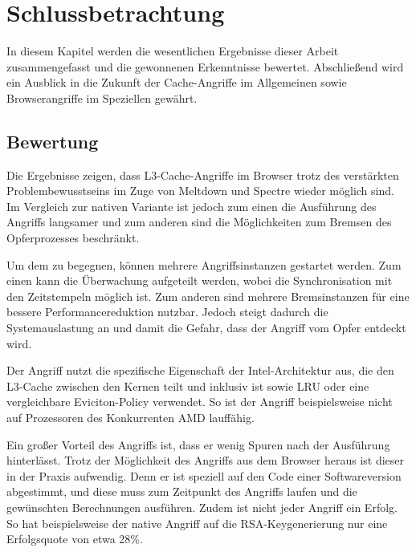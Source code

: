 \chapter{Schlussbetrachtung}
\label{chapter:conclusions}

In diesem Kapitel werden die wesentlichen Ergebnisse dieser Arbeit zusammengefasst und die gewonnenen Erkenntnisse bewertet.
Abschließend wird ein Ausblick in die Zukunft der Cache-Angriffe im Allgemeinen sowie Browserangriffe im Speziellen gewährt.

\section{Bewertung}

Die Ergebnisse zeigen, dass L3-Cache-Angriffe im Browser trotz des verstärkten Problembewusstseins im Zuge von Meltdown und Spectre wieder möglich sind.
Im Vergleich zur nativen Variante ist jedoch zum einen die Ausführung des Angriffs langsamer und zum anderen sind die Möglichkeiten zum Bremsen des Opferprozesses beschränkt.

Um dem zu begegnen, können mehrere Angriffsinstanzen gestartet werden.
Zum einen kann die Überwachung aufgeteilt werden, wobei die Synchronisation mit den Zeitstempeln möglich ist.
Zum anderen sind mehrere Bremsinstanzen für eine bessere Performancereduktion nutzbar.
Jedoch steigt dadurch die Systemauslastung an und damit die Gefahr, dass der Angriff vom Opfer entdeckt wird. 


Der Angriff nutzt die spezifische Eigenschaft der Intel-Architektur aus, die den L3-Cache zwischen den Kernen teilt und inklusiv ist sowie LRU oder eine vergleichbare Eviciton-Policy verwendet. 
So ist der Angriff beispielsweise nicht auf Prozessoren des Konkurrenten AMD lauffähig.

Ein großer Vorteil des Angriffs ist, dass er wenig Spuren nach der Ausführung hinterlässt.
Trotz der Möglichkeit des Angriffs aus dem Browser heraus%
ist dieser in der Praxis aufwendig.
Denn er ist speziell auf den Code einer Softwareversion abgestimmt, und diese muss zum Zeitpunkt des Angriffs laufen und die gewünschten Berechnungen ausführen. 
Zudem ist nicht jeder Angriff ein Erfolg. So hat beispielsweise der native Angriff auf die RSA-Keygenerierung \cite{RSAKeyGeneration2} nur eine Erfolgsquote von etwa 28\%.


